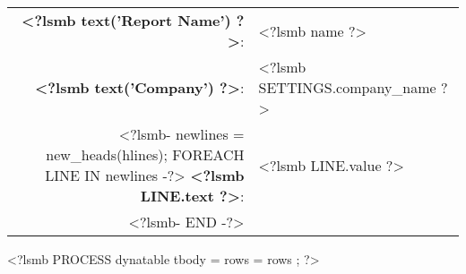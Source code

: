 \documentclass[<?lsmb SETTINGS.papersize ?>paper]{article}
\begin{document}
\begin{center}
\begin{tabular}{rl}
  \textbf{<?lsmb text('Report Name') ?>}: & <?lsmb name ?> \\
  \textbf{<?lsmb text('Company') ?>}: & <?lsmb SETTINGS.company_name ?> \\
  <?lsmb- newlines = new_heads(hlines);
  FOREACH LINE IN newlines -?>
  \textbf{<?lsmb LINE.text ?>}: & <?lsmb LINE.value ?> \\
  <?lsmb- END -?>
\end{tabular}
\end{center}

<?lsmb PROCESS dynatable
      tbody = { rows = rows };
?>
\end{document}
